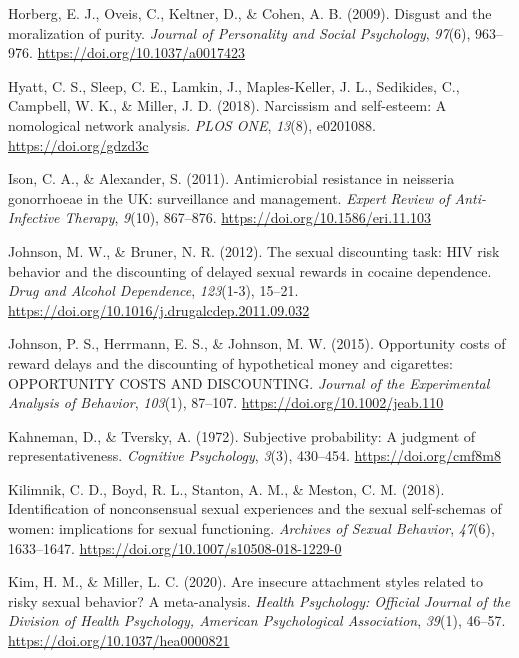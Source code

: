 \documentclass[
  donotrepeattitle,doc, 12pt, a4paper,floatsintext]{apa7}
\newlength{\cslhangindent}
\newlength{\cslentryspacingunit} %
\newenvironment{CSLReferences}[2] %
 {%
  \setlength{\parindent}{0pt}
  \ifodd #1
  \let\oldpar\par
  \def\par{\hangindent=\cslhangindent\oldpar}
  \fi
  \setlength{\parskip}{#2\cslentryspacingunit}
 }%
 {}
\begin{document}
\begin{CSLReferences}{1}{0}
\leavevmode{}%
Horberg, E. J., Oveis, C., Keltner, D., \& Cohen, A. B. (2009). Disgust and the moralization of purity. \emph{Journal of Personality and Social Psychology}, \emph{97}(6), 963--976. \url{https://doi.org/10.1037/a0017423}

\leavevmode{}%
Hyatt, C. S., Sleep, C. E., Lamkin, J., Maples-Keller, J. L., Sedikides, C., Campbell, W. K., \& Miller, J. D. (2018). Narcissism and self-esteem: A nomological network analysis. \emph{PLOS ONE}, \emph{13}(8), e0201088. \url{https://doi.org/gdzd3c}

\leavevmode{}%
Ison, C. A., \& Alexander, S. (2011). Antimicrobial resistance in neisseria gonorrhoeae in the UK: surveillance and management. \emph{Expert Review of Anti-Infective Therapy}, \emph{9}(10), 867--876. \url{https://doi.org/10.1586/eri.11.103}

\leavevmode{}%
Johnson, M. W., \& Bruner, N. R. (2012). The sexual discounting task: HIV risk behavior and the discounting of delayed sexual rewards in cocaine dependence. \emph{Drug and Alcohol Dependence}, \emph{123}(1-3), 15--21. \url{https://doi.org/10.1016/j.drugalcdep.2011.09.032}

\leavevmode{}%
Johnson, P. S., Herrmann, E. S., \& Johnson, M. W. (2015). Opportunity costs of reward delays and the discounting of hypothetical money and cigarettes: OPPORTUNITY COSTS AND DISCOUNTING. \emph{Journal of the Experimental Analysis of Behavior}, \emph{103}(1), 87--107. \url{https://doi.org/10.1002/jeab.110}

\leavevmode{}%
Kahneman, D., \& Tversky, A. (1972). Subjective probability: A judgment of representativeness. \emph{Cognitive Psychology}, \emph{3}(3), 430--454. \url{https://doi.org/cmf8m8}

\leavevmode{}%
Kilimnik, C. D., Boyd, R. L., Stanton, A. M., \& Meston, C. M. (2018). Identification of nonconsensual sexual experiences and the sexual self-schemas of women: implications for sexual functioning. \emph{Archives of Sexual Behavior}, \emph{47}(6), 1633--1647. \url{https://doi.org/10.1007/s10508-018-1229-0}

\leavevmode{}%
Kim, H. M., \& Miller, L. C. (2020). Are insecure attachment styles related to risky sexual behavior? A meta-analysis. \emph{Health Psychology: Official Journal of the Division of Health Psychology, American Psychological Association}, \emph{39}(1), 46--57. \url{https://doi.org/10.1037/hea0000821}


\end{CSLReferences}
\end{document}
